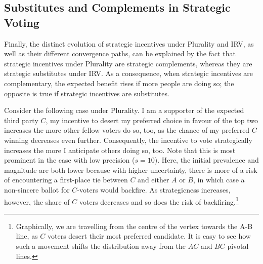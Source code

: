 \documentclass[12pt, letter]{article}
\begin{document}

\subsection{Substitutes and Complements in Strategic Voting}

Finally, the distinct evolution of strategic incentives under Plurality and IRV, as well as their different convergence paths, can be explained by the fact that strategic incentives under Plurality are strategic complements, whereas they are strategic substitutes under IRV. As a consequence, when strategic incentives are complementary, the expected benefit rises if more people are doing so; the opposite is true if strategic incentives are substitutes.

Consider the following case under Plurality. I am a supporter of the expected third party $C$, my incentive to desert my preferred choice in favour of the top two increases the more other fellow voters do so, too, as the chance of my preferred $C$ winning decreases even further. Consequently, the incentive to vote strategically increases the more I anticipate others doing so, too. Note that this is most prominent in the case with low precision ($s = 10$). Here, the initial prevalence and magnitude are both lower because with higher uncertainty, there is more of a risk of encountering a first-place tie between $C$ and either $A$ or $B$, in which case a non-sincere ballot for $C$-voters would backfire. As strategicness increases, however, the share of $C$ voters decreases and so does the risk of backfiring.\footnote{Graphically, we are travelling from the centre of the vertex towards the A-B line, as $C$ voters desert their most preferred candidate. It is easy to see how such a movement shifts the distribution away from the $AC$ and $BC$ pivotal lines.}
\end{document}
